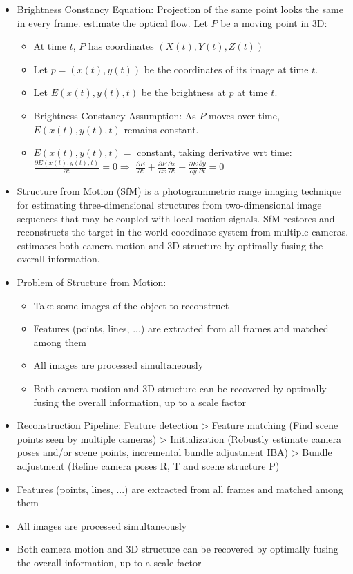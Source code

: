\documentclass[10pt]{article}
\begin{document}
\begin{itemize}[label=\(\star\), leftmargin=1em, itemsep=-0.3em]
    \item Brightness Constancy Equation: Projection of the same point looks the same in every frame. estimate the optical flow.  Let $P$ be a moving point in 3D:
          \begin{itemize}[label=\(\star\), leftmargin=1em, itemsep=-0.3em]
              \item At time $t$, $P$ has coordinates $(X(t),Y(t),Z(t))$
              \item Let $p=(x(t),y(t))$ be the coordinates of its image at time $t$.
              \item Let $E(x(t),y(t),t)$ be the brightness at $p$ at time $t$.
              \item Brightness Constancy Assumption: As $P$ moves over time, $E(x(t),y(t),t)$ remains constant.
              \item[] $E(x(t),y(t),t) =$ constant, taking derivative wrt time: $\frac{\partial E(x(t),y(t),t)}{\partial t} = 0 \Longrightarrow$ $\frac{\partial E}{\partial t} + \frac{\partial E}{\partial x} \frac{\partial x}{\partial t} + \frac{\partial E}{\partial y} \frac{\partial y}{\partial t} = 0$
          \end{itemize}
    \item  Structure from Motion (SfM) is a photogrammetric range imaging technique for estimating three-dimensional structures from two-dimensional image sequences that may be coupled with local motion signals. SfM restores and reconstructs the target in the world coordinate system from multiple cameras. estimates both camera motion and 3D structure by optimally fusing the overall information.

    \item Problem of Structure from Motion:
          \begin{itemize}[label=\(\star\), leftmargin=1em, itemsep=-0.3em]
              \item Take some images of the object to reconstruct
              \item Features (points, lines, ...) are extracted from all frames and matched among them
              \item All images are processed simultaneously
              \item Both camera motion and 3D structure can be recovered by optimally fusing the overall information, up to a scale factor
          \end{itemize}
    \item Reconstruction Pipeline: Feature detection > Feature matching (Find scene points seen by multiple cameras) > Initialization
          (Robustly estimate camera poses and/or scene points, incremental bundle adjustment IBA) > Bundle adjustment (Refine camera poses R, T and scene structure P)
    \item Features (points, lines, ...) are extracted from all frames and matched among them
    \item All images are processed simultaneously
    \item Both camera motion and 3D structure can be recovered by optimally fusing the overall information, up to a scale factor


\end{itemize}
\end{document}
